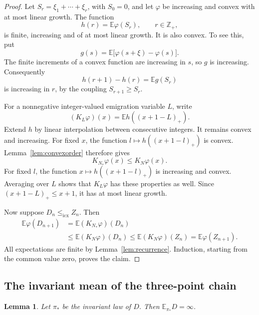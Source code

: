 \documentclass[11pt]{amsart}
\numberwithin{equation}{section}
\newtheorem{lemma}[theorem]{Lemma}
\theoremstyle{remark}
\newcommand{\E}{\mathbb E}
\newcommand{\Z}{\mathbb Z}
\newcommand{\icx}{\le_{\mathrm{icx}}}
\begin{document}
\begin{proof}
Let $S_r=\xi_1+\cdots+\xi_r$, with $S_0=0$, and let $\varphi$ be increasing and convex with at most linear growth. The function
\[
 h(r)=\E\varphi(S_r),\qquad r\in\Z_+,
\]
is finite, increasing and of at most linear growth. It is also convex. To see this, put
\[
 g(s)=\E\bigl[\varphi(s+\xi)-\varphi(s)\bigr].
\]
The finite increments of a convex function are increasing in $s$, so $g$ is increasing. Consequently
\[
 h(r+1)-h(r)=\E g(S_r)
\]
is increasing in $r$, by the coupling $S_{r+1}\ge S_r$.

For a nonnegative integer-valued emigration variable $L$, write
\[
 (K_L\varphi)(x)=\E h((x+1-L)_+).
\]
Extend $h$ by linear interpolation between consecutive integers. It remains convex and increasing. For fixed $x$, the function $l\mapsto h((x+1-l)_+)$ is convex. Lemma~\ref{lem:convexorder} therefore gives
\begin{equation}\label{eq:kernelcompare}
 K_{N_*}\varphi(x)\le K_N\varphi(x).
\end{equation}
For fixed $l$, the function $x\mapsto h((x+1-l)_+)$ is increasing and convex. Averaging over $L$ shows that $K_L\varphi$ has these properties as well. Since $(x+1-L)_+\le x+1$, it has at most linear growth.

Now suppose $D_n\icx Z_n$. Then
\begin{align*}
 \E\varphi(D_{n+1})
 &=\E(K_{N_*}\varphi)(D_n)\\
 &\le\E(K_N\varphi)(D_n)
 \le\E(K_N\varphi)(Z_n)
 =\E\varphi(Z_{n+1}).
\end{align*}
All expectations are finite by Lemma~\ref{lem:recurrence}. Induction, starting from the common value zero, proves the claim.
\end{proof}

\subsection{The invariant mean of the three-point chain}

\begin{lemma}\label{lem:pgf}
Let $\pi_*$ be the invariant law of $D$. Then $\E_{\pi_*}D=\infty$.
\end{lemma}
\end{document}
